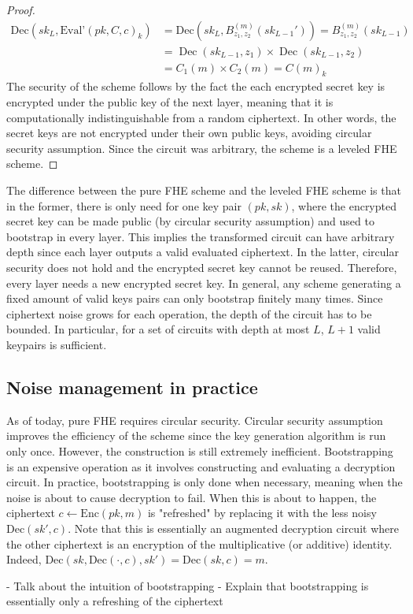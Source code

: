 \begin{proof}
\begin{equation*}
    \begin{aligned}
    \text{Dec}(sk_L, \text{Eval'}(pk, C, c)_k) &= \text{Dec}(sk_L, B_{z_1,z_2}^{(m)}(sk_{L-1}')) = B_{z_1,z_2}^{(m)}(sk_{L-1}) \\
    &= \operatorname{Dec}(sk_{L-1}, z_1) \times \operatorname{Dec}(sk_{L-1}, z_2) \\
    &= C_1(m) \times C_2(m) = C(m)_k
    \end{aligned}
\end{equation*}
The security of the scheme follows by the fact the each encrypted secret key is encrypted under the public key of the next layer, meaning that it is computationally indistinguishable from a random ciphertext. In other words, the secret keys are not encrypted under their own public keys, avoiding circular security assumption. Since the circuit was arbitrary, the scheme is a leveled FHE scheme.
\end{proof}

The difference between the pure FHE scheme and the leveled FHE scheme is that in the former, there is only need for one key pair $(pk,sk)$, where the encrypted secret key can be made public (by circular security assumption) and used to bootstrap in every layer. This implies the transformed circuit can have arbitrary depth since each layer outputs a valid evaluated ciphertext. In the latter, circular security does not hold and the encrypted secret key cannot be reused. Therefore, every layer needs a new encrypted secret key. In general, any scheme generating a fixed amount of valid keys pairs can only bootstrap finitely many times. Since ciphertext noise grows for each operation, the depth of the circuit has to be bounded. In particular, for a set of circuits with depth at most $L$, $L+1$ valid keypairs is sufficient.

\subsection*{Noise management in practice}
As of today, pure FHE requires circular security. Circular security assumption improves the efficiency of the scheme since the key generation algorithm is run only once. However, the construction is still extremely inefficient. Bootstrapping is an expensive operation as it involves constructing and evaluating a decryption circuit. In practice, bootstrapping is only done when necessary, meaning when the noise is about to cause decryption to fail. When this is about to happen, the ciphertext $c \leftarrow \text{Enc}(pk, m)$ is "refreshed" by replacing it with the less noisy $\text{Dec}(sk',c)$. Note that this is essentially an augmented decryption circuit where the other ciphertext is an encryption of the multiplicative (or additive) identity. Indeed, $\text{Dec}(sk,\text{Dec}(\cdot,c), sk') = \text{Dec}(sk,c) = m$.

- Talk about the intuition of bootstrapping
- Explain that bootstrapping is essentially only a refreshing of the ciphertext